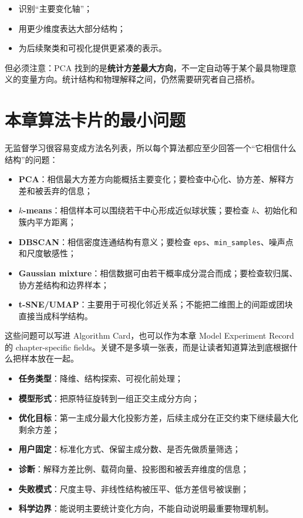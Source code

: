 \begin{itemize}
    \item 识别“主要变化轴”；
    \item 用更少维度表达大部分结构；
    \item 为后续聚类和可视化提供更紧凑的表示。
\end{itemize}

但必须注意：PCA 找到的是\textbf{统计方差最大方向}，不一定自动等于某个最具物理意义的变量方向。统计结构和物理解释之间，仍然需要研究者自己搭桥。

\section{本章算法卡片的最小问题}

无监督学习很容易变成方法名列表，所以每个算法都应至少回答一个“它相信什么结构”的问题：

\begin{itemize}
    \item \textbf{PCA}：相信最大方差方向能概括主要变化；要检查中心化、协方差、解释方差和被丢弃的信息；
    \item \textbf{\(k\)-means}：相信样本可以围绕若干中心形成近似球状簇；要检查 \(k\)、初始化和簇内平方距离；
    \item \textbf{DBSCAN}：相信密度连通结构有意义；要检查 \texttt{eps}、\texttt{min\_samples}、噪声点和尺度敏感性；
    \item \textbf{Gaussian mixture}：相信数据可由若干概率成分混合而成；要检查软归属、协方差结构和边界样本；
    \item \textbf{t-SNE/UMAP}：主要用于可视化邻近关系；不能把二维图上的间距或团块直接当成科学结构。
\end{itemize}

这些问题可以写进 Algorithm Card，也可以作为本章 Model Experiment Record 的 chapter-specific fields。关键不是多填一张表，而是让读者知道算法到底根据什么把样本放在一起。

\begin{examplebox}
\begin{itemize}
    \item \textbf{任务类型}：降维、结构探索、可视化前处理；
    \item \textbf{模型形式}：把原特征旋转到一组正交主成分方向；
    \item \textbf{优化目标}：第一主成分最大化投影方差，后续主成分在正交约束下继续最大化剩余方差；
    \item \textbf{用户固定}：标准化方式、保留主成分数、是否先做质量筛选；
    \item \textbf{诊断}：解释方差比例、载荷向量、投影图和被丢弃维度的信息；
    \item \textbf{失败模式}：尺度主导、非线性结构被压平、低方差信号被误删；
    \item \textbf{科学边界}：能说明主要统计变化方向，不能自动说明最重要物理机制。
\end{itemize}
\end{examplebox}

